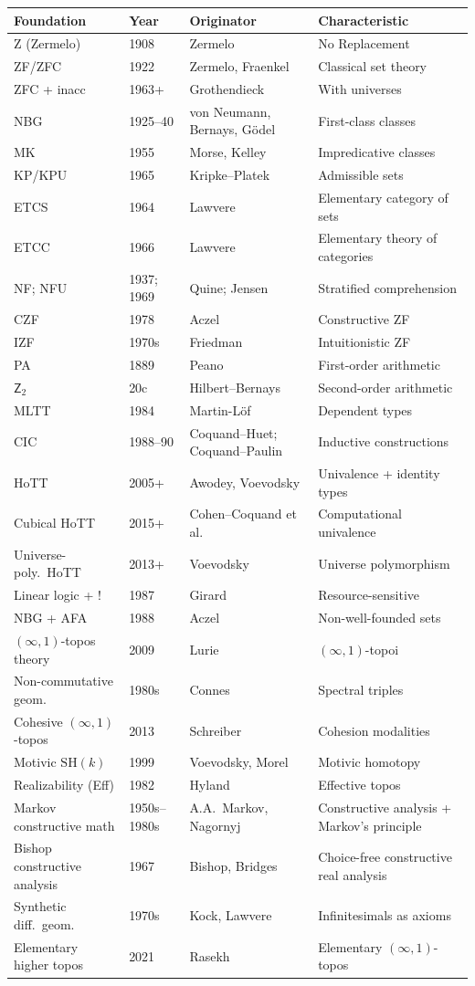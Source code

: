 \documentclass[11pt]{article}
\theoremstyle{plain}
\theoremstyle{definition}
\begin{document}
\begin{longtable}{@{}p{3.8cm}l p{4cm} p{4.6cm}@{}}
\toprule
Foundation & Year & Originator & Characteristic \\ \midrule
Z (Zermelo) & 1908 & Zermelo & No Replacement \\
ZF/ZFC & 1922 & Zermelo, Fraenkel & Classical set theory \\
ZFC + inacc & 1963+ & Grothendieck & With universes \\
NBG & 1925--40 & von Neumann, Bernays, G\"odel & First-class classes \\
MK & 1955 & Morse, Kelley & Impredicative classes \\
KP/KPU & 1965 & Kripke--Platek & Admissible sets \\
ETCS & 1964 & Lawvere & Elementary category of sets \\
ETCC & 1966 & Lawvere & Elementary theory of categories \\
NF; NFU & 1937; 1969 & Quine; Jensen & Stratified comprehension \\
CZF & 1978 & Aczel & Constructive ZF \\
IZF & 1970s & Friedman & Intuitionistic ZF \\
PA & 1889 & Peano & First-order arithmetic \\
$\mathsf{Z}_2$ & 20c & Hilbert--Bernays & Second-order arithmetic \\
MLTT & 1984 & Martin-L\"of & Dependent types \\
CIC & 1988--90 & Coquand--Huet; Coquand--Paulin & Inductive constructions \\
HoTT & 2005+ & Awodey, Voevodsky & Univalence + identity types \\
Cubical HoTT & 2015+ & Cohen--Coquand et al. & Computational univalence \\
Universe-poly.\ HoTT & 2013+ & Voevodsky & Universe polymorphism \\
Linear logic + ! & 1987 & Girard & Resource-sensitive \\
NBG + AFA & 1988 & Aczel & Non-well-founded sets \\
$(\infty, 1)$-topos theory & 2009 & Lurie & $(\infty, 1)$-topoi \\
Non-commutative geom.\ & 1980s & Connes & Spectral triples \\
Cohesive $(\infty, 1)$-topos & 2013 & Schreiber & Cohesion modalities \\
Motivic $\mathrm{SH}(k)$ & 1999 & Voevodsky, Morel & Motivic homotopy \\
Realizability (Eff) & 1982 & Hyland & Effective topos \\
Markov constructive math & 1950s--1980s & A.A.~Markov, Nagornyj & Constructive analysis + Markov's principle \\
Bishop constructive analysis & 1967 & Bishop, Bridges & Choice-free constructive real analysis \\
Synthetic diff.~geom.\ & 1970s & Kock, Lawvere & Infinitesimals as axioms \\
Elementary higher topos & 2021 & Rasekh & Elementary $(\infty, 1)$-topos \\
\bottomrule
\end{longtable}
\end{document}
